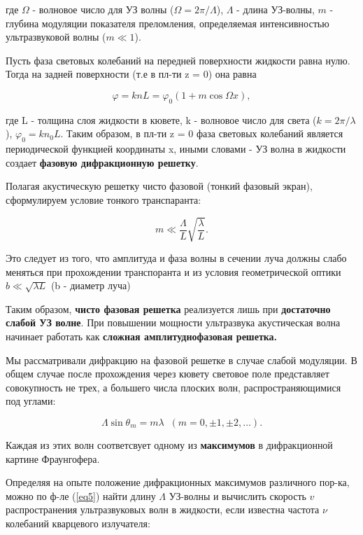 \documentclass[a4paper,12pt]{article}
\begin{document}
где $\Omega$ - волновое число для УЗ волны ($\Omega = 2\pi / \Lambda$), $\Lambda$ -  длина УЗ-волны, $m$ - глубина модуляции показателя преломления, определяемая интенсивностью ультразвуковой волны ($m \ll 1$). 

Пусть фаза световых колебаний на передней поверхности жидкости равна нулю. Тогда на задней поверхности (т.е в пл-ти z = 0) она равна

\begin{equation}
\varphi = k n L = \varphi_0 (1 + m \cos{\Omega x}),
\label{eq3}
\end{equation}

где L - толщина слоя жидкости в кювете, k - волновое число для света ($k = 2\pi /  \lambda$), $\varphi_0 = k n_0 L$. Таким образом, в пл-ти z = 0 фаза световых колебаний является периодической функцией координаты x, иными словами - УЗ волна в жидкости создает  \textbf{фазовую дифракционную решетку}. 

Полагая акустическую решетку чисто фазовой  (тонкий фазовый экран), сформулируем условие тонкого транспаранта:

\begin{equation}
m \ll \frac{\Lambda}{L} \sqrt{\frac{\lambda}{L}}. 
\label{eq4}
\end{equation}

Это следует из того, что амплитуда и фаза волны в сечении луча должны слабо меняться при прохождении транспоранта и из условия геометрической оптики $b \ll \sqrt{\lambda L}$ (b - диаметр луча)

Таким образом, \textbf{чисто фазовая решетка} реализуется лишь при \textbf{достаточно слабой УЗ волне}. При повышении мощности ультразвука акустическая волна начинает работать как \textbf{сложная амплитуднофазовая решетка. }


Мы рассматривали дифракцию на фазовой решетке в случае слабой модуляции. В общем случае после прохождения через кювету световое поле представляет совокупность не трех, а большего числа плоских волн, распространяющимися под углами:

\begin{equation}
\Lambda \sin{\theta_m} = m \lambda \; \; (m = 0, \pm 1, \pm 2, …). 
\label{eq5}
\end{equation}

Каждая из этих волн соответсвует одному из \textbf{максимумов} в дифракционной картине Фраунгофера. 

Определяя на опыте положение дифракционных максимумов различного пор-ка, можно по ф-ле (\ref{eq5}) найти длину $\Lambda$ УЗ-волны и вычислить скорость $v$ распространения ультразвуковых волн в жидкости, если известна частота  $\nu$ колебаний кварцевого излучателя:
\end{document}
